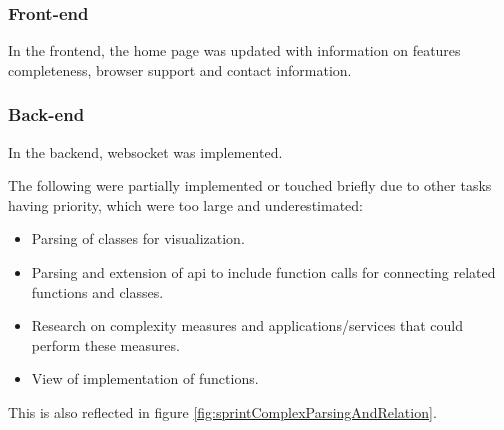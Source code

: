 \subsubsection{Front-end}
In the \gls{frontend}, the home page was updated with information on features completeness, browser support and contact information.

\subsubsection{Back-end}
In the \gls{backend}, \gls{websocket} was implemented.

The following were partially implemented or touched briefly due to other tasks having priority, which were too large and underestimated:
\begin{itemize}
    \item Parsing of classes for visualization.
    \item Parsing and extension of \gls{api} to include function calls for connecting related functions and classes.
    \item Research on complexity measures and applications/services that could perform these measures.
    \item View of implementation of functions.
\end{itemize}

This is also reflected in figure \ref{fig:sprintComplexParsingAndRelation}.

